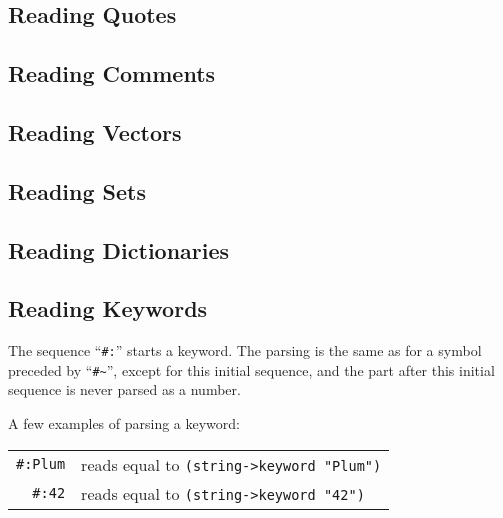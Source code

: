 \subsection{Reading Quotes}
\label{subsec:aml-base-lang-reader-quotes}





\subsection{Reading Comments}
\label{subsec:aml-base-lang-reader-comments}





\subsection{Reading Vectors}
\label{subsec:aml-base-lang-reader-vectors}





\subsection{Reading Sets}
\label{subsec:aml-base-lang-reader-sets}





\subsection{Reading Dictionaries}
\label{subsec:aml-base-lang-reader-dictionaries}





\subsection{Reading Keywords}
\label{subsec:aml-base-lang-reader-keywords}

The sequence ``\lstinline!#:!'' starts a keyword. The parsing is the same as for a symbol preceded by ``\lstinline!#~!'', except for this initial sequence, and the part after this initial sequence is never parsed as a number. 

\example A few examples of parsing a keyword:

\begin{tabular}{ r l }
  \lstinline!#:Plum! & reads equal to \lstinline!(string->keyword "Plum")! \\
  \lstinline!#:42! & reads equal to \lstinline!(string->keyword "42")! \\
\end{tabular}








